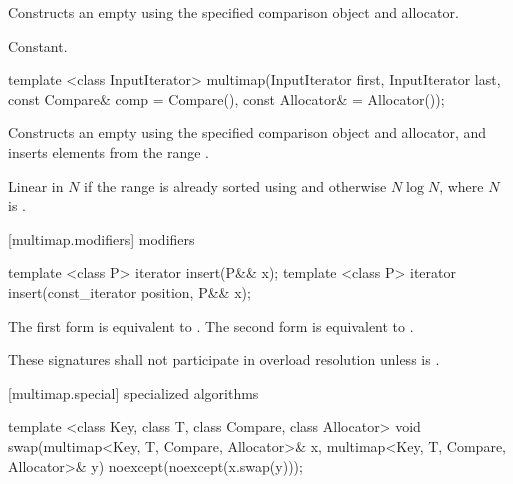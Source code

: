 \begin{itemdescr}
\pnum
\effects
Constructs an empty
using the specified comparison object and allocator.

\pnum
\complexity
Constant.
\end{itemdescr}

%
\begin{itemdecl}
template <class InputIterator>
  multimap(InputIterator first, InputIterator last,
           const Compare& comp = Compare(),
           const Allocator& = Allocator());
\end{itemdecl}

\begin{itemdescr}
\pnum
\effects
Constructs an empty
using the specified comparison object and allocator,
and inserts elements from the range
.

\pnum
\complexity
Linear in $N$ if the range
is already sorted using 
and otherwise $N \log{N}$,
where $N$ is
.
\end{itemdescr}

[multimap.modifiers]{ modifiers}

%
%
\begin{itemdecl}
template <class P> iterator insert(P&& x);
template <class P> iterator insert(const_iterator position, P&& x);
\end{itemdecl}

\begin{itemdescr}
\pnum
\effects
The first form is equivalent to 
. The second form is
equivalent to .

\pnum
\remarks
These signatures shall not participate in overload resolution
unless  is
.
\end{itemdescr}

[multimap.special]{ specialized algorithms}

%
%
\begin{itemdecl}
template <class Key, class T, class Compare, class Allocator>
  void swap(multimap<Key, T, Compare, Allocator>& x,
            multimap<Key, T, Compare, Allocator>& y)
    noexcept(noexcept(x.swap(y)));
\end{itemdecl}

